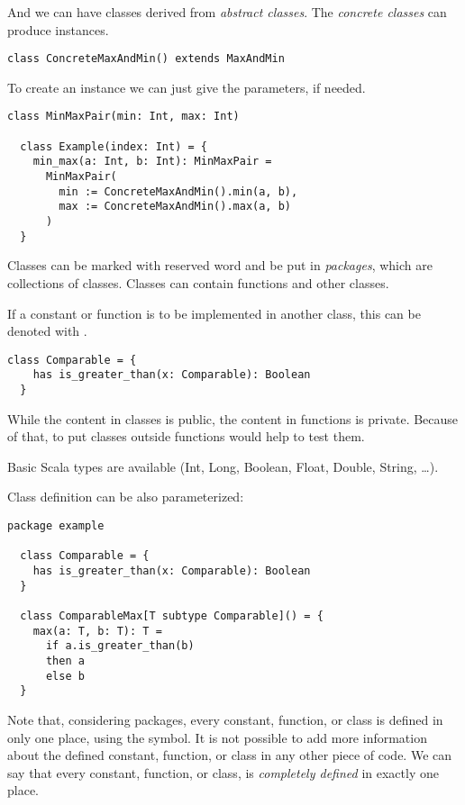 And we can have classes derived from \emph{abstract classes}.
The \emph{concrete classes} can produce instances.

\begin{lstlisting}[label={lst:exampleClassMaxWithIndex}]
  class ConcreteMaxAndMin() extends MaxAndMin
\end{lstlisting}

To create an instance we can just give the parameters, if needed.

\begin{lstlisting}[label={lst:exampleClassMaxAnInstance}]
  class MinMaxPair(min: Int, max: Int)

  class Example(index: Int) = {
    min_max(a: Int, b: Int): MinMaxPair =
      MinMaxPair(
        min := ConcreteMaxAndMin().min(a, b),
        max := ConcreteMaxAndMin().max(a, b)
      )
  }
\end{lstlisting}

Classes can be marked with \spackage reserved word and be put in \emph{packages}, which are collections of classes.
Classes can contain functions and other classes.

If a constant or function is to be implemented in another class, this can be denoted with \shas.

\begin{lstlisting}[label={lst:exampleAbstractFunction}]
  class Comparable = {
    has is_greater_than(x: Comparable): Boolean
  }
\end{lstlisting}

While the content in classes is public, the content in functions is private.
Because of that, to put classes outside functions would help to test them.

Basic Scala types are available (Int, Long, Boolean, Float, Double, String, \ldots).

Class definition can be also parameterized:
\begin{lstlisting}[label={lst:exampleParameterizedClass}]
  package example

  class Comparable = {
    has is_greater_than(x: Comparable): Boolean
  }

  class ComparableMax[T subtype Comparable]() = {
    max(a: T, b: T): T =
      if a.is_greater_than(b)
      then a
      else b
  }
\end{lstlisting}

Note that, considering packages, every constant, function, or class is defined in only one place, using the \sdef symbol.
It is not possible to add more information about the defined constant, function, or class in any other piece of code.
We can say that every constant, function, or class, is \emph{completely defined} in exactly one place.

